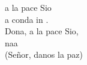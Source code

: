 \begin{cancion}%
	a la pace Sio\\
	a  conda in .\\
	Dona, a la pace Sio,\\
	naa\\
(Señor, danos la paz)\\
\end{cancion}%
